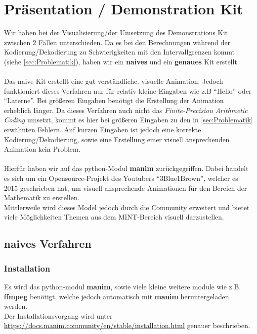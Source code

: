 \documentclass[a4paper]{article}
\theoremstyle{definition}
\theoremstyle{remark}
\begin{document}
	\newpage
			\section{Präsentation / Demonstration Kit}
Wir haben bei der Visualisierung/der Umsetzung des Demonstrations Kit zwischen 2 Fällen unterschieden. Da es bei den Berechnungen während der Kodierung/Dekodierung zu Schwierigkeiten mit den Intervallgrenzen kommt (siehe \ref{sec:Problematik}), haben wir ein \textbf{naives} und ein \textbf{genaues} Kit erstellt.
\\
\\
Das naive Kit erstellt eine gut verständliche, visuelle Animation. Jedoch funktioniert dieses Verfahren nur für relativ kleine Eingaben wie z.B ``Hello'' oder ``Laterne''. Bei größeren Eingaben benötigt die Erstellung der Animation erheblich länger. Da dieses Verfahren auch nicht das \textit{Finite-Precision Arithmetic Coding} umsetzt, kommt es hier bei größeren Eingaben zu den in \ref{sec:Problematik} erwähnten Fehlern. Auf kurzen Eingaben ist jedoch eine korrekte
Kodierung/Dekodierung, sowie eine Erstellung einer visuell ansprechenden Animation kein Problem. 
\\
\\
Hierfür haben wir auf das python-Modul \textbf{manim} zurückgegriffen. Dabei handelt es sich um ein Opensource-Projekt des Youtubers ``3Blue1Brown'', welcher es 2015 geschrieben hat, um visuell ansprechende Animationen für den Bereich der Mathematik zu erstellen.\cite{3blue1brown}
\\
Mittlerweile wird dieses Model jedoch durch die Community erweitert und bietet viele Möglichkeiten Themen aus dem MINT-Bereich visuell darzustellen.
\subsection{naives Verfahren}
\label{sec:manim}
\subsubsection{Installation}
Es wird das python-modul \textbf{manim}, sowie viele kleine weitere module wie z.B. \textbf{ffmpeg} benötigt, welche jedoch automatisch mit \textbf{manim} heruntergeladen werden.\\
Der Installationsvorgang wird unter \href{https://docs.manim.community/en/stable/installation.html}{https://docs.manim.community/en/stable/installation.html}
genauer beschrieben.
\\
\end{document}
